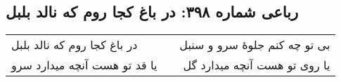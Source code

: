 \begin{center}
\section*{رباعی شماره ۳۹۸: در باغ کجا روم که نالد بلبل}
\label{sec:sh398}
\begin{longtable}{l p{0.5cm} r}
در باغ کجا روم که نالد بلبل
&&
بی تو چه کنم جلوهٔ سرو و سنبل
\\
یا قد تو هست آنچه میدارد سرو
&&
یا روی تو هست آنچه میدارد گل
\\
\end{longtable}
\end{center}
